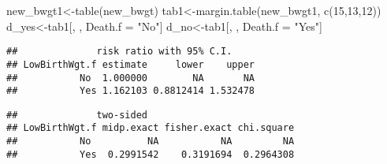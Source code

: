 \documentclass[
]{article}
\newenvironment{Shaded}{\begin{snugshade}}{\end{snugshade}}
\newcommand{\CommentTok}[1]{\textcolor[rgb]{0.56,0.35,0.01}{\textit{#1}}}
\newcommand{\DecValTok}[1]{\textcolor[rgb]{0.00,0.00,0.81}{#1}}
\newcommand{\FunctionTok}[1]{\textcolor[rgb]{0.00,0.00,0.00}{#1}}
\newcommand{\NormalTok}[1]{#1}
\newcommand{\OtherTok}[1]{\textcolor[rgb]{0.56,0.35,0.01}{#1}}
\newcommand{\SpecialCharTok}[1]{\textcolor[rgb]{0.00,0.00,0.00}{#1}}
\newcommand{\StringTok}[1]{\textcolor[rgb]{0.31,0.60,0.02}{#1}}
\begin{document}
\begin{Shaded}
\begin{Highlighting}[]
\NormalTok{new\_bwgt1}\OtherTok{\textless{}{-}}\FunctionTok{table}\NormalTok{(new\_bwgt)}
\NormalTok{tab1}\OtherTok{\textless{}{-}}\FunctionTok{margin.table}\NormalTok{(new\_bwgt1, }\FunctionTok{c}\NormalTok{(}\DecValTok{15}\NormalTok{,}\DecValTok{13}\NormalTok{,}\DecValTok{12}\NormalTok{))}
\NormalTok{d\_yes}\OtherTok{\textless{}{-}}\NormalTok{tab1[, , Death.f }\OtherTok{=} \StringTok{"No"}\NormalTok{]}
\NormalTok{d\_no}\OtherTok{\textless{}{-}}\NormalTok{tab1[, , Death.f }\OtherTok{=} \StringTok{"Yes"}\NormalTok{]}
\end{Highlighting}
\end{Shaded}

\begin{Shaded}
\end{Shaded}

\begin{verbatim}
##              risk ratio with 95% C.I.
## LowBirthWgt.f estimate     lower    upper
##           No  1.000000        NA       NA
##           Yes 1.162103 0.8812414 1.532478
\end{verbatim}

\begin{Shaded}
\end{Shaded}

\begin{verbatim}
##              two-sided
## LowBirthWgt.f midp.exact fisher.exact chi.square
##           No          NA           NA         NA
##           Yes  0.2991542    0.3191694  0.2964308
\end{verbatim}

\begin{Shaded}
\end{Shaded}
\end{document}
